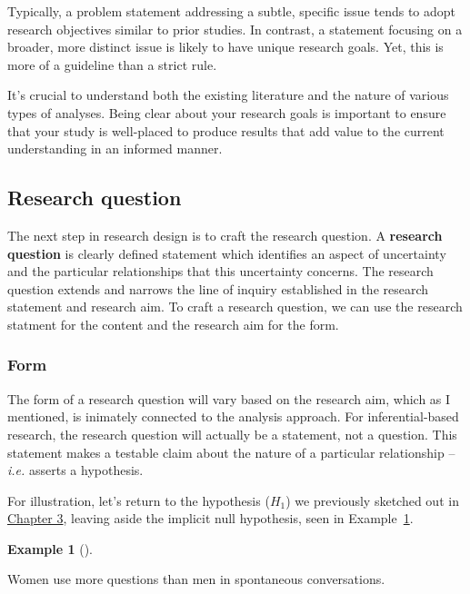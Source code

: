 \documentclass[
  letterpaper,
  DIV=11,
  numbers=noendperiod]{scrreport}
\theoremstyle{definition}
\newtheorem{example}{Example}[chapter]
\theoremstyle{remark}
\begin{document}
Typically, a problem statement addressing a subtle, specific issue tends
to adopt research objectives similar to prior studies. In contrast, a
statement focusing on a broader, more distinct issue is likely to have
unique research goals. Yet, this is more of a guideline than a strict
rule.

It's crucial to understand both the existing literature and the nature
of various types of analyses. Being clear about your research goals is
important to ensure that your study is well-placed to produce results
that add value to the current understanding in an informed manner.

\hypertarget{sec-fr-question}{%
\subsection{Research question}\label{sec-fr-question}}

The next step in research design is to craft the research question. A
\textbf{research question} is clearly defined
statement which identifies an aspect of uncertainty and the particular
relationships that this uncertainty concerns. The research question
extends and narrows the line of inquiry established in the research
statement and research aim. To craft a research question, we can use the
research statment for the content and the research aim for the form.

\hypertarget{sec-fr-question-form}{%
\subsubsection{Form}\label{sec-fr-question-form}}

The form of a research question will vary based on the research aim,
which as I mentioned, is inimately connected to the analysis approach.
For inferential-based research, the research question will actually be a
statement, not a question. This statement makes a testable claim about
the nature of a particular relationship --\emph{i.e.} asserts a
hypothesis.

For illustration, let's return to the hypothesis (\(H_1\)) we previously
sketched out in \protect\hyperlink{sec-approaching-analysis}{Chapter 3},
leaving aside the implicit null hypothesis, seen in
Example~\ref{exm-fr-form-infer}.

\begin{example}[]\protect\hypertarget{exm-fr-form-infer}{}\label{exm-fr-form-infer}

Women use more questions than men in spontaneous conversations.

\end{example}
\end{document}
